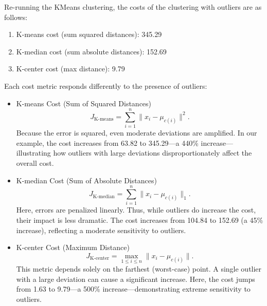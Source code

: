 \documentclass{article}
\begin{document}
\newpage
\noindent Re-running the KMeans clustering, the costs of the clustering with outliers are as follows:
\begin{enumerate}
    \itemsep 0em
    \item K-means cost (sum squared distances): 345.29
    \item K-median cost (sum absolute distances): 152.69
    \item K-center cost (max distance): 9.79
\end{enumerate}
Each cost metric responds differently to the presence of outliers:
\begin{itemize}
\item {K-means Cost (Sum of Squared Distances)}
\[
J_{\text{K-means}} = \sum_{i=1}^{n} \| x_i - \mu_{c(i)} \|^2.
\]
Because the error is squared, even moderate deviations are amplified. In our example, the cost increases from 63.82 to 345.29—a 440\% increase—illustrating how outliers with large deviations disproportionately affect the overall cost.

\item {K-median Cost (Sum of Absolute Distances)}
\[
J_{\text{K-median}} = \sum_{i=1}^{n} \| x_i - \mu_{c(i)} \|_1.
\]
Here, errors are penalized linearly. Thus, while outliers do increase the cost, their impact is less dramatic. The cost increases from 104.84 to 152.69 (a 45\% increase), reflecting a moderate sensitivity to outliers.

\item {K-center Cost (Maximum Distance)}
\[
J_{\text{K-center}} = \max_{1 \leq i \leq n} \| x_i - \mu_{c(i)} \|.
\]
This metric depends solely on the farthest (worst-case) point. A single outlier with a large deviation can cause a significant increase. Here, the cost jumps from 1.63 to 9.79—a 500\% increase—demonstrating extreme sensitivity to outliers.
\end{itemize}

\newpage
\end{document}
